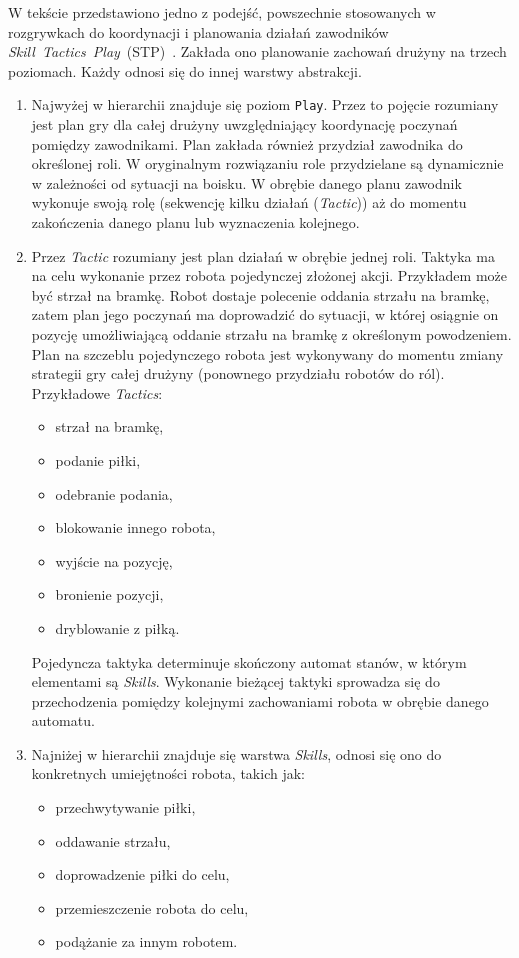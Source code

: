 W tekście przedstawiono jedno z podejść, powszechnie stosowanych w rozgrywkach do koordynacji i planowania działań zawodników \mbox{\textit{Skill Tactics Play}}~(STP)~\cite{stp}.
Zakłada ono planowanie zachowań drużyny na trzech poziomach. Każdy odnosi się do innej warstwy abstrakcji.
\begin{enumerate} 
  \item Najwyżej w hierarchii znajduje się poziom \texttt{Play}. Przez to pojęcie rozumiany jest plan gry dla całej drużyny uwzględniający koordynację
  poczynań pomiędzy zawodnikami. Plan zakłada również przydział zawodnika do określonej roli. W oryginalnym rozwiązaniu role przydzielane są dynamicznie w zależności od sytuacji na boisku.
  W obrębie danego planu zawodnik wykonuje swoją rolę (sekwencję kilku działań (\textit{Tactic})) aż do momentu zakończenia danego planu lub wyznaczenia kolejnego.
  
  \item Przez \textit{Tactic} rozumiany jest plan działań w obrębie jednej roli. Taktyka ma na celu wykonanie przez robota pojedynczej złożonej akcji.
  Przykładem może być strzał na bramkę. Robot dostaje polecenie oddania strzału na bramkę, zatem plan jego poczynań ma doprowadzić
 do sytuacji, w której osiągnie on pozycję umożliwiającą oddanie strzału na bramkę z określonym powodzeniem.
 Plan na szczeblu pojedynczego robota jest wykonywany do momentu zmiany strategii gry całej drużyny (ponownego przydziału robotów do ról).
 Przykładowe \textit{Tactics}:
 \begin{itemize}
  \item strzał na bramkę,
  \item podanie piłki,
  \item odebranie podania,
  \item blokowanie innego robota,
  \item wyjście na pozycję,
  \item bronienie pozycji,
  \item dryblowanie z piłką.
 \end{itemize}

  Pojedyncza taktyka determinuje skończony automat stanów, w którym elementami są \textit{Skills}. Wykonanie bieżącej taktyki sprowadza się do przechodzenia pomiędzy kolejnymi zachowaniami robota w obrębie
  danego automatu.
\newpage
  \item Najniżej w hierarchii znajduje się warstwa \textit{Skills}, odnosi się ono do konkretnych umiejętności robota, takich jak:
    \begin{itemize}
    \item przechwytywanie piłki,
    \item oddawanie strzału,
    \item doprowadzenie piłki do celu,
    \item przemieszczenie robota do celu,
    \item podążanie za innym robotem.
    \end{itemize}


\end{enumerate}
